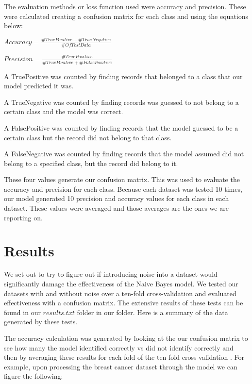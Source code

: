 \documentclass[twoside,11pt]{article}
\begin{document}
The evaluation methods or loss function used were accuracy and precision. These were calculated creating a confusion matrix for each class and using the equations below:
\begin{center}
    $Accuracy = \frac{\#TruePositive + \#TrueNegative}{\# Of TestData}$\\
\end{center}

\begin{center}
    $Precision = \frac{\#TruePositive}{\#TruePositive + \#FalsePositive}$\\
\end{center}

A TruePositive was counted by finding records that belonged to a class that our model predicted it was. 

A TrueNegative was counted by finding records was guessed to not belong to a certain class and the model was correct.

A FalsePositive was counted by finding records that the model guessed to be a certain class but the record did not belong to that class.

A FalseNegative was counted by finding records that the model assumed did not belong to a specified class, but the record did belong to it.

These four values generate our confusion matrix. This was used to evaluate the accuracy and precision for each class. Because each dataset was tested 10 times, our model generated 10 precision and accuracy values for each class in each dataset. These values were averaged and those averages are the ones we are reporting on.

\section{Results}

We set out to try to figure out if introducing noise into a dataset would significantly damage the effectiveness of the Naive Bayes model. We tested our datasets with and without noise over a ten-fold cross-validation and evaluated effectiveness with a confusion matrix. The extensive results of these tests can be found in our $results.txt$ folder in our folder. Here is a summary of the data generated by these tests.

The accuracy calculation was generated by looking at the our confusion matrix to see how many the model identified correctly vs did not identify correctly and then by averaging these results for each fold of the ten-fold cross-validation . For example, upon processing the breast cancer dataset through the model we can figure the following:
\end{document}
